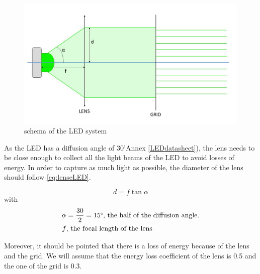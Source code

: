 \begin{figure}[h]
  \centerline{\includegraphics[scale=0.4]{fig/LEDsystem.jpg}}
  \caption{schema of the LED system}
  \label{fig:LEDsystem}
\end{figure}

As the LED has a diffusion angle of 30\textdegree 'Annex \ref{LEDdatasheet}), the lens needs to be close enough to collect all the light beams of the LED to avoid losses of energy. In order to capture as much light as possible, the diameter of the lens should follow \eqref{eq:lenseLED}.

\begin{equation}
\label{eq:lenseLED}
d = f \tan \alpha
\end{equation}
with 
\begin{align*}
\alpha & = \frac{30}{2} = 15\mbox{\textdegree, the half of the diffusion angle.}\\
f & \mbox{, the focal length of the lens}
\end{align*}

Moreover, it should be pointed that there is a loss of energy because of the lens and the grid. We will assume that the energy loss coefficient of the lens is 0.5 and the one of the grid is 0.3.
